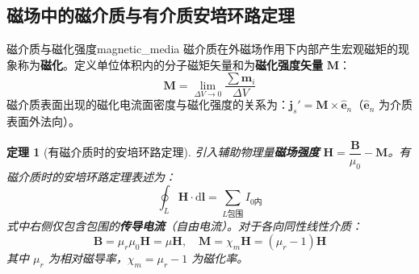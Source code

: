\documentclass[11pt,a4paper,fontset=fandol]{ctexart}
\newtheorem{theorem}{定理}[section]
\theoremstyle{remark}
\begin{document}
\subsection{磁场中的磁介质与有介质安培环路定理}

\begin{definition}{磁介质与磁化强度}{magnetic_media}
磁介质在外磁场作用下内部产生宏观磁矩的现象称为\textbf{磁化}。定义单位体积内的分子磁矩矢量和为\textbf{磁化强度矢量} $\bm{M}$：
\begin{equation}
    \bm{M} = \lim_{\Delta V \to 0}\frac{\sum \bm{m}_i}{\Delta V}
\end{equation}
磁介质表面出现的磁化电流面密度与磁化强度的关系为：$\bm{j}_s' = \bm{M} \times \hat{\bm{e}}_n$（$\hat{\bm{e}}_n$ 为介质表面外法向）。
\end{definition}

\begin{theorem}[有磁介质时的安培环路定理]
引入辅助物理量\textbf{磁场强度} $\bm{H} = \dfrac{\bm{B}}{\mu_0} - \bm{M}$。有磁介质时的安培环路定理表述为：
\begin{equation}
    \oint_L \bm{H} \cdot \mathrm{d}\bm{l} = \sum_{L\text{包围}} I_{0\text{内}}
\end{equation}
式中右侧仅包含包围的\textbf{传导电流}（自由电流）。对于各向同性线性介质：
\begin{equation}
    \bm{B} = \mu_r \mu_0 \bm{H} = \mu \bm{H}, \quad \bm{M} = \chi_m \bm{H} = (\mu_r - 1)\bm{H}
\end{equation}
其中 $\mu_r$ 为相对磁导率，$\chi_m = \mu_r - 1$ 为磁化率。
\end{theorem}
\end{document}
